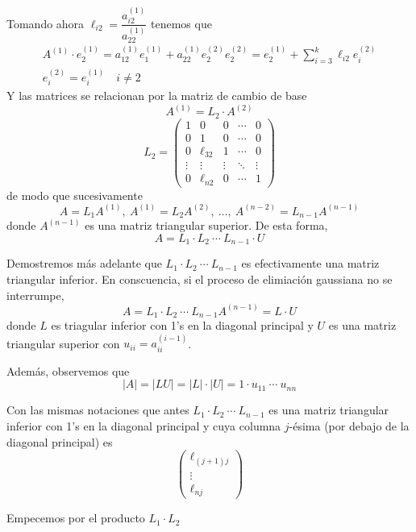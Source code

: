 \begin{met}
Tomando ahora $\ell_{i2}=\dfrac{a_{i2}^{(1)}}{a_{22}^{(1)}}$ tenemos que
$$ \begin{array}{cc}
A^{(1)}\cdot e_2^{(1)}=a_{12}^{(1)}e_1^{(1)}+a_{22}^{(1)}e_2^{(2)}
     e_2^{(2)}=e_2^{(1)}+\sum_{i=3}^k \ell_{i2}e_i^{(2)}   \\
     e_i^{(2)}=e_i^{(1)} \quad i \neq 2
\end{array} 
$$
Y las matrices se relacionan por la matriz de cambio de base
$$A^{(1)}=L_2\cdot A^{(2)}$$
$$L_2=\left(\begin{array}{ccccc}
   1  &0&0&\cdots&0  \\
    0 & 1&0&\cdots&0\\
    0 &\ell_{32}&1&\cdots&0\\
    \vdots &\vdots&\vdots & \ddots & \vdots\\
    0&\ell_{n2}&0&\cdots & 1
\end{array}\right)$$
de modo que sucesivamente $$A=L_1A^{(1)}, \: A^{(1)}=L_2A^{(2)}, \: \ldots , \: A^{(n-2)}=L_{n-1} A^{(n-1)}$$ donde $A^{(n-1)}$ es una matriz triangular superior. De esta forma, $$A=L_1 \cdot L_2 \: \cdots \: L_{n-1} \cdot U$$

Demostremos más adelante que $L_1 \cdot L_2 \: \cdots \:  L_{n-1}$ es efectivamente una matriz triangular inferior. En conscuencia, si el proceso de elimiación gaussiana no se interrumpe, 
$$A = L_1\cdot L_2 \: \cdots \: L_{n-1} A^{(n-1)}=L \cdot U$$
donde $L$ es triagular inferior con 1's en la diagonal principal y $U$ es una matriz triangular superior con $u_{ii}=a_{ii}^{(i-1)}$. 

Además, observemos que 
$$|A|=|LU|=|L|\cdot |U|=1 \cdot u_{11} \: \cdots \: u_{nn}$$

\begin{prop}
Con las mismas notaciones que antes $L_1 \cdot L_2 \: \cdots \: L_{n-1}$ es una matriz triangular inferior con 1's en la diagonal principal y cuya columna $j$-ésima (por debajo de la diagonal principal) es 
$$\begin{pmatrix}
    \ell_{(j+1)j} \\
    \vdots \\
    \ell_{nj}
\end{pmatrix}$$
\end{prop}
\begin{dem}

Empecemos por el producto $L_1\cdot L_2$


\end{dem}
\end{met}

